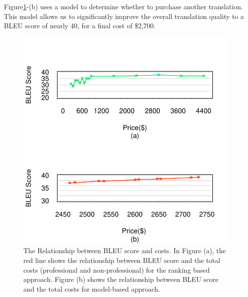 \documentclass[11pt,letterpaper]{article}
\begin{document}
Figure\ref{fbleucost}-(b) uses a model to determine whether to purchase another translation.  
This model allows us to significantly improve the overall translation quality to a BLEU score of nearly 40, for a final cost of \$2,700.


\begin{figure}[htbp]
  \centering
  \includegraphics[width=\linewidth]{cost-bleu/pricecost.pdf}
  \caption{The Relationship between BLEU score and costs. In Figure (a), the red line shows the relationship between BLEU score and  the total costs (professional and non-professional) for the ranking based approach. 
  Figure (b) shows the relationship between BLEU score and the total costs for model-based approach. 
  }
    \label{fbleucost}
\end{figure}
\end{document}
